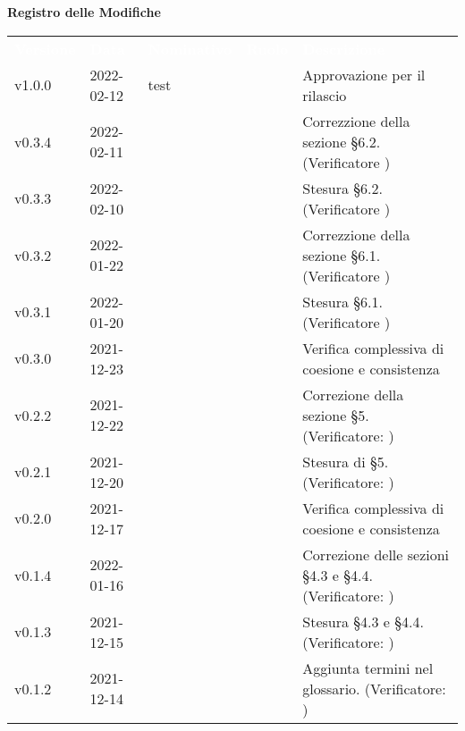 
{\LARGE{\textbf{Registro delle Modifiche}}} \\
\renewcommand{\arraystretch}{1.5}
\begin{longtable}{ m{}<{\centering}  m{}<{\centering}  m{}<{\centering}  m{}<{\centering}  m{}<{\centering} }
	\rowcolor{darkblue}
	\textcolor{white}{\textbf{Versione}} &\textcolor{white}{\textbf{Data}}& \textcolor{white}{\textbf{Nominativo}} & \textcolor{white}{\textbf{Ruolo}}& \textcolor{white}{\textbf{Descrizione}} \\ 	
	v1.0.0& 2022-02-12 & test & \RE{}  & Approvazione per il rilascio\\

	v0.3.4& 2022-02-11 & \EP{} & \AM{} & Correzzione della sezione §6.2. (Verificatore \textit{\MB}) \\

	v0.3.3& 2022-02-10 & \EP{} & \AM{} & Stesura §6.2. (Verificatore \textit{\MB}) \\

	v0.3.2& 2022-01-22 & \EP{} & \AM{} & Correzzione della sezione §6.1. (Verificatore \textit{\MB}) \\

	v0.3.1& 2022-01-20 & \EP{} & \AM{} & Stesura §6.1. (Verificatore \textit{\MB}) \\

	v0.3.0& 2021-12-23 & \EP{} & \VE{} & Verifica complessiva di coesione e consistenza\\	

	v0.2.2& 2021-12-22 & \EP{} & \AM{} & Correzione della sezione §5. (Verificatore: \textit{\MB})\\
	
	v0.2.1& 2021-12-20 & \EP{} & \AM{} & Stesura di §5. (Verificatore: \textit{\MB})\\

	v0.2.0& 2021-12-17 & \EP{} & \VE{} & Verifica complessiva di coesione e consistenza\\	
	
	v0.1.4& 2022-01-16 & \MB{} & \AM{} & Correzione delle sezioni §4.3 e §4.4. (Verificatore: \textit{\FP})\\
	
	v0.1.3& 2021-12-15 & \MB{} & \AM{} & Stesura §4.3 e §4.4. (Verificatore: \textit{\FP})\\

	v0.1.2& 2021-12-14 & \EP{} & \RE{} & Aggiunta termini nel glossario. (Verificatore: \textit{\FP})\\


\end{longtable}
